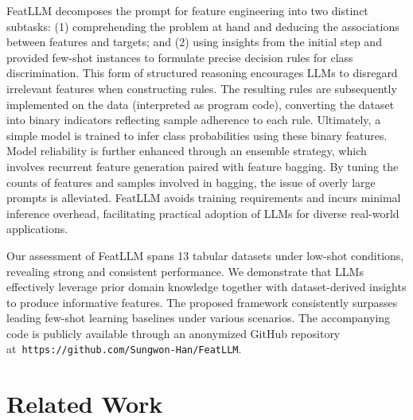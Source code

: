 \textsf{FeatLLM} decomposes the prompt for feature engineering into two distinct subtasks: (1) comprehending the problem at hand and deducing the associations between features and targets; and (2) using insights from the initial step and provided few-shot instances to formulate precise decision rules for class discrimination. This form of structured reasoning encourages LLMs to disregard irrelevant features when constructing rules. The resulting rules are subsequently implemented on the data (interpreted as program code), converting the dataset into binary indicators reflecting sample adherence to each rule. Ultimately, a simple model is trained to infer class probabilities using these binary features. Model reliability is further enhanced through an ensemble strategy, which involves recurrent feature generation paired with feature bagging. By tuning the counts of features and samples involved in bagging, the issue of overly large prompts is alleviated. \textsf{FeatLLM} avoids training requirements and incurs minimal inference overhead, facilitating practical adoption of LLMs for diverse real-world applications.

Our assessment of \textsf{FeatLLM} spans 13 tabular datasets under low-shot conditions, revealing strong and consistent performance. We demonstrate that LLMs effectively leverage prior domain knowledge together with dataset-derived insights to produce informative features. The proposed framework consistently surpasses leading few-shot learning baselines under various scenarios. The accompanying code is publicly available through an anonymized GitHub repository at~\texttt{https://github.com/Sungwon-Han/FeatLLM}.

\section{Related Work}

